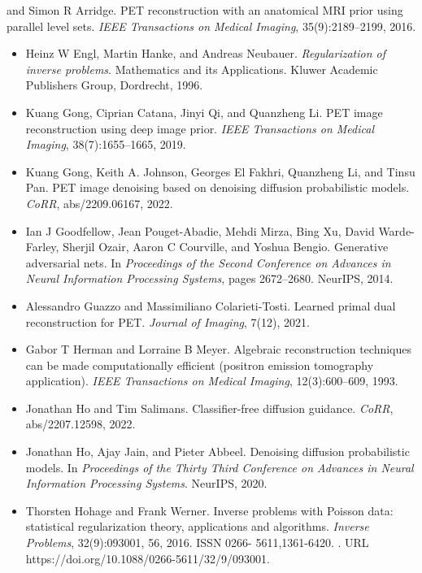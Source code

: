 \documentclass{article}
\begin{document}
and Simon R Arridge. PET reconstruction with an anatomical MRI prior using parallel level sets. \textit{IEEE Transactions on Medical Imaging}, 35(9):2189–2199, 2016.
\begin{itemize}
\item 
Heinz W Engl, Martin Hanke, and Andreas Neubauer. \textit{Regularization of inverse problems}. Mathematics and its Applications. Kluwer Academic Publishers Group, Dordrecht, 1996.

\item 
Kuang Gong, Ciprian Catana, Jinyi Qi, and Quanzheng Li. PET image reconstruction using deep image prior. \textit{IEEE Transactions on Medical Imaging}, 38(7):1655–1665, 2019.

\item 
Kuang Gong, Keith A. Johnson, Georges El Fakhri, Quanzheng Li, and Tinsu Pan. PET image denoising based on denoising diffusion probabilistic models. \textit{CoRR}, abs/2209.06167, 2022.

\item 
Ian J Goodfellow, Jean Pouget-Abadie, Mehdi Mirza, Bing Xu, David Warde-Farley, Sherjil Ozair, Aaron C Courville, and Yoshua Bengio. Generative adversarial nets. In \textit{Proceedings of the Second Conference on Advances in Neural Information Processing Systems}, pages 2672–2680. NeurIPS, 2014.

\item 
Alessandro Guazzo and Massimiliano Colarieti-Tosti. Learned primal dual reconstruction for PET. \textit{Journal of Imaging}, 7(12), 2021.

\item 
Gabor T Herman and Lorraine B Meyer. Algebraic reconstruction techniques can be made computationally efficient (positron emission tomography application). \textit{IEEE Transactions on Medical Imaging}, 12(3):600–609, 1993.

\item 
Jonathan Ho and Tim Salimans. Classifier-free diffusion guidance. \textit{CoRR}, abs/2207.12598, 2022.

\item 
Jonathan Ho, Ajay Jain, and Pieter Abbeel. Denoising diffusion probabilistic models. In \textit{Proceedings of the Thirty Third Conference on Advances in Neural Information Processing Systems}. NeurIPS, 2020.

\item 
Thorsten Hohage and Frank Werner. Inverse problems with Poisson data: statistical regularization theory, applications and algorithms. \textit{Inverse Problems}, 32(9):093001, 56, 2016. ISSN 0266- 5611,1361-6420. . URL https://doi.org/10.1088/0266-5611/32/9/093001.


\end{itemize}
\end{document}
